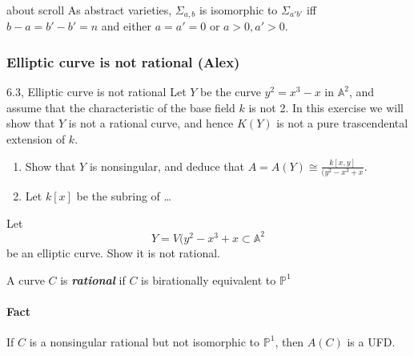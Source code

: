 \begin{manualexercise}{about scroll}
	As abstract varieties, $\Sigma_{a,b}$ is isomorphic to $\Sigma_{a'b'}$ iff $b-a=b'-b'=n$ and either  $a=a'=0$ or  $a>0, a'>0$.
\end{manualexercise}

\subsubsection{Elliptic curve is not rational (Alex)}
\begin{manualexercise}{6.3, Elliptic curve is not rational}
	Let  $Y$ be the curve $y^2=x^3-x$ in $\mathbb{A}^2$, and assume that the characteristic of the base field $k$ is not 2. In this exercise we will show that $Y$ is not a rational curve, and hence $K(Y)$ is not a pure trascendental extension of $k$.
\begin{enumerate}[label=\alph*.]
	\item Show that $Y$ is nonsingular, and deduce that $A=A(Y)\cong \frac{k[x,y]}{(y^2-x^3+x}$.
	\item Let $k[x]$ be the subring of …
\end{enumerate}
\end{manualexercise}

\begin{manualexercise}{6.2}
Let
	\[Y=V(y^2-x^3+x\subset \mathbb{A}^2\]
	be an elliptic curve. Show it is not rational.
\end{manualexercise}

\begin{defn}
	A curve $C$ is \textit{\textbf{rational}} if $C$ is birationally equivalent to $\mathbb{P}^1$
\end{defn}

\paragraph{Fact} If $C$ is a nonsingular rational but not isomorphic to $\mathbb{P}^1$, then $A(C)$ is a UFD.

